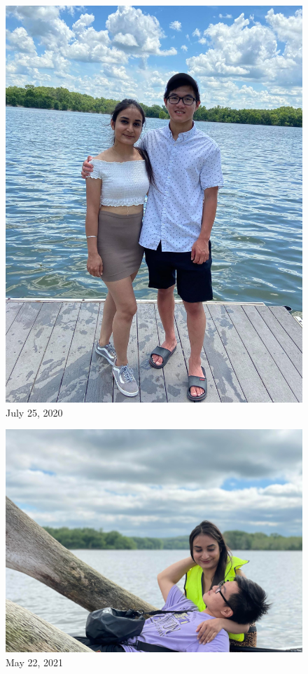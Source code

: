 \documentclass[
]{book}
\begin{document}
\begin{figure}
\centering
\includegraphics[width=5.20833in,height=\textheight]{images/manjot kayak.jpg}
\caption{July 25, 2020}
\end{figure}

\begin{figure}
\centering
\includegraphics[width=5.20833in,height=\textheight]{mimages/9.1 5-22-2021.jpg}
\caption{May 22, 2021}
\end{figure}
\end{document}
